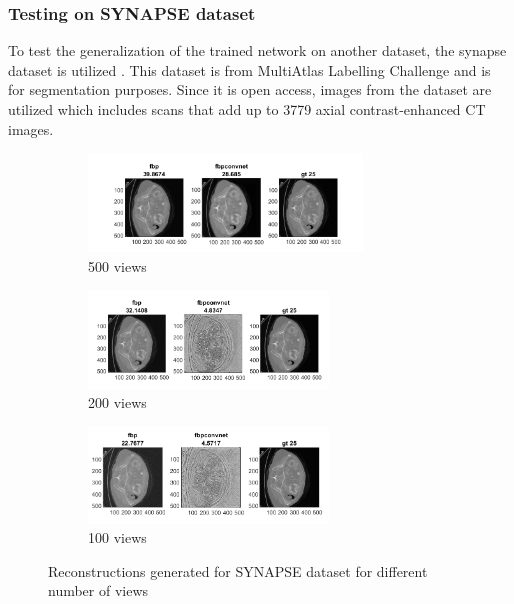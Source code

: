 \documentclass[journal, onecolumn, 11pt]{IEEEtran}
\begin{document}
\subsubsection{Testing on SYNAPSE dataset}
To test the generalization of the trained network on another dataset, the synapse dataset is utilized \cite{SYNAPSE}. This dataset is from MultiAtlas Labelling Challenge and is for segmentation purposes. Since it is open access, images from the dataset are utilized which includes scans that add up to 3779 axial contrast-enhanced CT images. 

\begin{figure}[h]
\centering
\begin{subfigure}[b]{\textwidth}
\centering
\includegraphics[width=0.8\textwidth]{images/SS2.png}
\caption{500 views}\label{subfig:3a}
\end{subfigure}
\begin{subfigure}[b]{\linewidth}
\centering
\includegraphics[width=0.7\textwidth]{images/SS5.png}
\caption{200 views}\label{subfig:3b}
\end{subfigure}
\begin{subfigure}[b]{\linewidth}
\centering
\includegraphics[width=0.7\textwidth]{images/SS10.png}
\caption{100 views}\label{subfig:3c}
\end{subfigure}
\caption{Reconstructions generated for SYNAPSE dataset for different number of views}
\label{fig:Synapses}
\end{figure}
\end{document}
